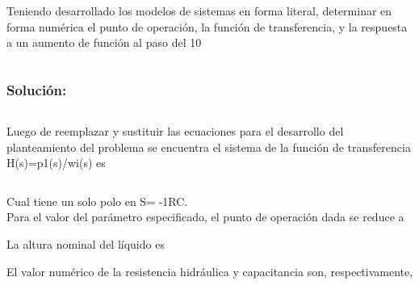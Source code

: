 \documentclass[a4paper,12pt,twoside]{proyectotanquesecci}
\begin{document}

Teniendo desarrollado los modelos de sistemas en forma literal, determinar en forma numérica el punto de operación, la función de transferencia, y la respuesta a un aumento de función al paso del 10%

\begin{equation}
\end{equation}

\subsubsection{Solución:}


\begin{equation}
\end{equation}

Luego de reemplazar y sustituir las ecuaciones para el desarrollo del planteamiento del problema se encuentra el sistema de la función de transferencia H(s)=p1(s)/wi(s) es

\begin{equation}
\end{equation}

Cual tiene un solo polo en S= -1RC.\\
Para el valor del parámetro especificado, el punto de operación dada se reduce a \\

\begin{equation}
\end{equation}

La altura nominal del líquido es \\

\begin{equation}
\end{equation}

El valor numérico de la resistencia hidráulica y capacitancia son, respectivamente, \\
\end{document}

